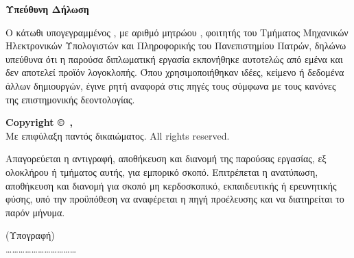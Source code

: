 
\thispagestyle{empty}

\vspace*{0.8cm}

\begin{center}
    {\Large \textbf{Υπεύθυνη Δήλωση}}
\end{center}

\vspace{0.8cm}

\noindent Ο κάτωθι υπογεγραμμένος \textbf{\thesisauthor}, με αριθμό μητρώου \textbf{\thesisauthorid}, φοιτητής του Τμήματος Μηχανικών Ηλεκτρονικών Υπολογιστών και Πληροφορικής του Πανεπιστημίου Πατρών, δηλώνω υπεύθυνα ότι η παρούσα διπλωματική εργασία εκπονήθηκε αυτοτελώς από εμένα και δεν αποτελεί προϊόν λογοκλοπής. Όπου χρησιμοποιήθηκαν ιδέες, κείμενο ή δεδομένα άλλων δημιουργών, έγινε ρητή αναφορά στις πηγές τους σύμφωνα με τους κανόνες της επιστημονικής δεοντολογίας.

\vspace{1.5cm}

\noindent \textbf{Copyright \copyright\ \thesisauthor, \thesisyear} \\
\noindent Με επιφύλαξη παντός δικαιώματος. All rights reserved.

\vspace{0.3cm}

\noindent Απαγορεύεται η αντιγραφή, αποθήκευση και διανομή της παρούσας εργασίας, εξ ολοκλήρου ή τμήματος αυτής, για εμπορικό σκοπό. Επιτρέπεται η ανατύπωση, αποθήκευση και διανομή για σκοπό μη κερδοσκοπικό, εκπαιδευτικής ή ερευνητικής φύσης, υπό την προϋπόθεση να αναφέρεται η πηγή προέλευσης και να διατηρείται το παρόν μήνυμα.

\vspace{2.5cm}

\begin{flushright}
    (Υπογραφή) \\[1.2cm]
    \dots\dots\dots\dots\dots\dots\dots\dots\dots\dots\dots \\
    \thesisauthor
\end{flushright}

\clearpage
